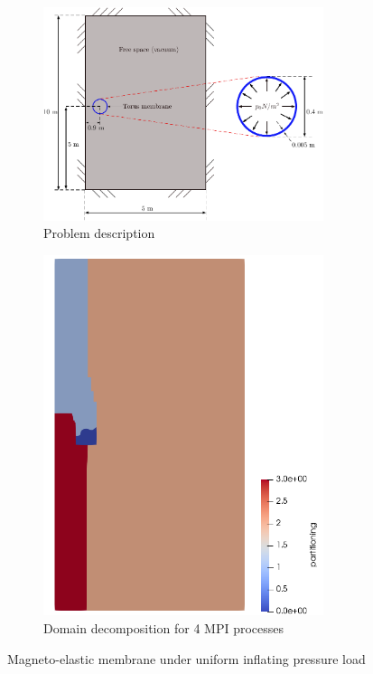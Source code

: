 \documentclass[11pt,a4paper,final]{article}
\begin{document}
\begin{figure}[h]
\centering 
\begin{subfigure}[b]{0.6\textwidth}
\centering
\includegraphics[width=0.9\textwidth]{torus_membrane_grid.pdf}
\caption{\scriptsize{Problem description}}
\label{fig:1.7.1}
\end{subfigure}
\begin{subfigure}[b]{0.39\textwidth}
\centering
\includegraphics[width=0.9\textwidth]{torus_grid_domain_decomp.png}
\caption{\scriptsize{Domain decomposition for 4 MPI processes}}
\label{fig:1.7.2}
\end{subfigure}
\caption{Magneto-elastic membrane under uniform inflating pressure load}
\label{fig:1.7}
\end{figure} 
\end{document}
